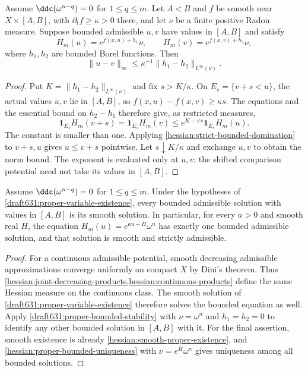 \begin{proposition}\label{draft631:proper-bounded-stability}
Assume $\ddc(\omega^{n-q})=0$ for $1\leq q\leq m$. Let $A<B$ and $f$ be
smooth near $X\times[A,B]$, with $\partial_t f\geq\kappa>0$
there, and let $\nu$ be a finite positive Radon measure.
Suppose bounded admissible $u,v$ have values in $[A,B]$ and satisfy
\[
 H_m(u)=e^{f(x,u)+h_1}\nu,\qquad
 H_m(v)=e^{f(x,v)+h_2}\nu,
\]
where $h_1,h_2$ are bounded Borel functions. Then
\[
 \|u-v\|_\infty
            \leq\kappa^{-1}\|h_1-h_2\|_{L^\infty(\nu)}.
\]
\end{proposition}
\begin{proof}
Put $K=\|h_1-h_2\|_{L^\infty(\nu)}$ and fix $s>K/\kappa$.
On $E_s=\{v+s<u\}$, the actual values $u,v$ lie in $[A,B]$,
so $f(x,u)-f(x,v)\geq\kappa s$. The equations and the essential
bound on $h_2-h_1$ therefore give, as restricted measures,
\[
 \mathbf1_{E_s}H_m(v+s)
 =\mathbf1_{E_s}H_m(v)
 \leq e^{K-\kappa s}\mathbf1_{E_s}H_m(u).
\]
The constant is smaller than one. Applying
\cref{hessian:strict-bounded-domination} to $v+s,u$ gives
$u\leq v+s$ pointwise. Let $s\downarrow K/\kappa$ and exchange
$u,v$ to obtain the norm bound. The exponent is evaluated only
at $u,v$; the shifted comparison potential need not take its
values in $[A,B]$.
\end{proof}

\begin{corollary}\label{draft631:proper-bounded-smoothness}
Assume $\ddc(\omega^{n-q})=0$ for $1\leq q\leq m$.
Under the hypotheses of \cref{draft631:proper-variable-existence},
every bounded admissible solution with values in $[A,B]$ is its
smooth solution. In particular, for every $a>0$ and smooth real
$H$, the equation $H_m(u)=e^{au+H}\omega^n$ has exactly one bounded
admissible solution, and that solution is smooth and strictly
admissible.
\end{corollary}
\begin{proof}
For a continuous admissible potential, smooth decreasing admissible
approximations converge uniformly on compact $X$ by Dini's theorem.
Thus \cref{hessian:joint-decreasing-products,hessian:continuous-products}
define the same Hessian measure on the continuous class.
The smooth solution of \cref{draft631:proper-variable-existence}
therefore solves the bounded equation as well. Apply
\cref{draft631:proper-bounded-stability} with $\nu=\omega^n$ and
$h_1=h_2=0$ to identify any other bounded solution in $[A,B]$
with it. For the final assertion, smooth existence is already
\cref{hessian:smooth-proper-existence}, and
\cref{hessian:proper-bounded-uniqueness} with
$\nu=e^H\omega^n$ gives uniqueness among all bounded solutions.
\end{proof}
